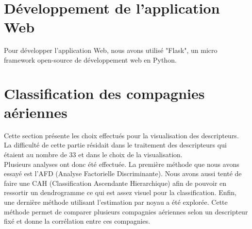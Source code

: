 \section*{Développement de l'application Web}

Pour développer l'application Web, nous avons utilisé "Flask", un micro framework open-source de développement web en Python. \\

\section*{Classification des compagnies aériennes}

Cette section présente les choix effectués pour la visualisation des descripteurs. La difficulté de cette partie résidait dans le traitement des descripteurs qui étaient au nombre de 33 et dans le choix de la visualisation. \\

Plusieurs analyses ont donc été effectuée. La première méthode que nous avons essayé est l'AFD (Analyse Factorielle Discriminante). Nous avons aussi tenté de faire une CAH (Classification Ascendante Hierarchique) afin de pouvoir en ressortir un dendrogramme ce qui est assez visuel pour la classification. Enfin, une dernière méthode utilisant l'estimation par noyau a été explorée. Cette méthode permet de comparer plusieurs compagnies aériennes selon un descripteur fixé et donne la corrélation entre ces compagnies. \\
